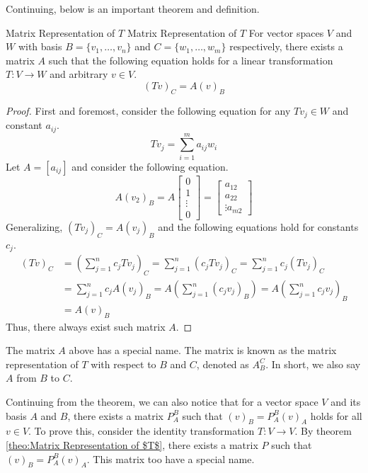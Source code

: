 \documentclass[../main.tex]{subfiles}
\begin{document}
Continuing, below is an important theorem and definition.

\begin{theorem}{Matrix Representation of $T$}
{Matrix Representation of $T$}
For vector spaces $V$ and $W$ with basis $B = \{ v_1, \ldots, v_n \}$
and $C = \{ w_1, \ldots, w_m \}$ respectively, there exists a matrix
$A$ such that the following equation holds for a linear transformation
$T: V \to W$ and arbitrary $v \in V$.
\vspace{-0.8\baselineskip}
\[
(Tv)_C = A(v)_B
\]
\end{theorem}
\begin{proof}
First and foremost, consider the following equation for any
$Tv_j \in W$ and constant $a_{ij}$.
\[
Tv_j = \sum_{i=1}^m a_{ij} w_i
\]
Let $A = [a_{ij}]$ and consider the following equation.
\[
A(v_2)_B
= A
\begin{bmatrix}
    0 \\
    1 \\
    \vdots \\
    0
\end{bmatrix}
=
\begin{bmatrix}
    a_{12} \\
    a_{22} \\
    \vdots
    a_{m2}
\end{bmatrix}
\]
Generalizing, $(Tv_j)_C = A(v_j)_B$ and the following equations hold
for constants $c_j$.
\begin{align*}
    (Tv)_C
    &= \left( \sum_{j=1}^n c_j Tv_j \right)_C
    = \sum_{j=1}^n (c_j Tv_j)_C
    = \sum_{j=1}^n c_j (Tv_j)_C \\
    &= \sum_{j=1}^n c_j A(v_j)_B
    = A \left( \sum_{j=1}^n (c_j v_j)_B \right)
    = A \left( \sum_{j=1}^n c_j v_j \right)_B \\
    &= A(v)_B
\end{align*}
Thus, there always exist such matrix $A$.
\end{proof}

The matrix $A$ above has a special name. The matrix is known as
the matrix representation of $T$ with respect to $B$ and $C$,
denoted as $A_B^C$. In short, we also say $A$ from $B$ to $C$.

Continuing from the theorem, we can also notice that for a vector
space $V$ and its basis $A$ and $B$, there exists a matrix $P_A^B$
such that $(v)_B = P_A^B (v)_A$ holds for all $v \in V$.
To prove this, consider the identity transformation $T: V \to V$.
By theorem \ref{theo:Matrix Representation of $T$}, there exists a
matrix $P$ such that $(v)_B = P_A^B (v)_A$. This matrix too have a
special name.
\end{document}
